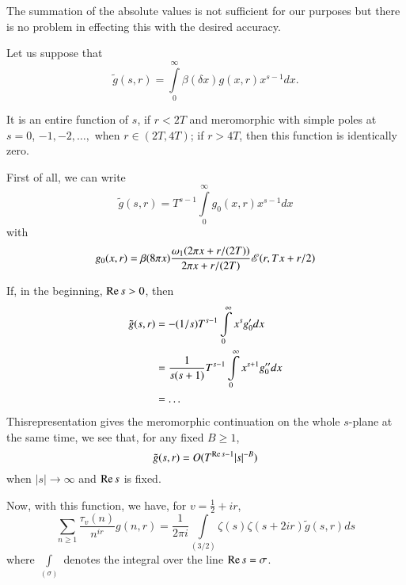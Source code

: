 The summation of the absolute values is not sufficient for our purposes but there is no problem in effecting this with the desired accuracy.

Let us suppose that 
\begin{equation}
\tilde{g} (s,r) = \int\limits^\infty_0 \beta (\delta x) g (x,r) x^{s-1} dx.  \label{art7-eq8.20}
\end{equation}

It is an entire function of $s$, if $r < 2 T$ and meromorphic with simple poles at $s =0$, $-1, -2,\ldots,$ when $r \in (2 T, 4 T)$; if $r>4T$, then this function is identically zero.

First of all, we can write 
\begin{equation}
\tilde{g} (s,r) = T^{s-1} \int\limits^\infty_0 g_0 (x,r) x^{s-1} dx \label{art7-eq8.21}
\end{equation}
with 
\begin{equation}
g_0(x,r) = \beta (8\pi x) \frac{\omega_1(2 \pi x+ r/ (2T))}{2 \pi x + r / (2T)} \mathscr{E} (r, T x + r/2) \label{art7-eq8.22}
\end{equation}

If, in the beginning, $\operatorname{Re} s> 0$, then
\begin{align}
\tilde{g} (s,r) & = -(1/s) T^{s-1} \int\limits^\infty_0 x^s g'_0 dx \label{art7-eq8.23}\\
& = \frac{1}{s(s+1)} T^{s-1} \int\limits^\infty_0 x^{s+1} g''_0 dx \notag\\
& = \ldots \notag
\end{align}
This\pageoriginale representation gives the meromorphic continuation on the whole $s$-plane at the same time, we see that, for any fixed $B \geqslant 1$,
\begin{equation}
\tilde{g} (s,r) = O (T^{\operatorname{Re} s-1} |s|^{-B}) \label{art7-eq8.24}
\end{equation}
when $|s| \to \infty$ and $\operatorname{Re} s$ is fixed.

Now, with this function, we have, for $v = \frac{1}{2} + ir$,
\begin{equation}
\sum\limits_{n \geqslant 1} \frac{\tau_v (n)}{n^{ir}} g (n,r) = \frac{1}{2 \pi i} \int\limits_{(3/2)} \zeta (s) \zeta(s+ 2 ir) \tilde{g} (s,r) ds\label{art7-eq8.25}
\end{equation}
where $\int\limits_{(\sigma)}$ denotes the integral over the line $\operatorname{Re} s = \sigma$.

